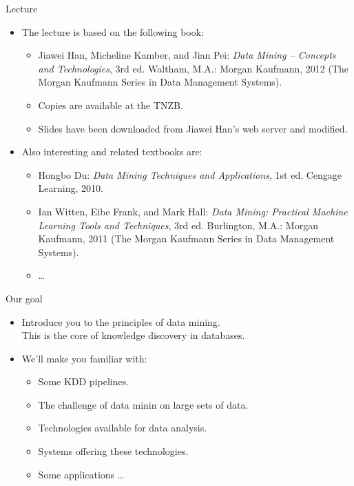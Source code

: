 \documentclass[aspectratio=169,t]{beamer}
\begin{document}
  { %
    \begin{frame}{Lecture}
      \begin{itemize}
          \item The lecture is based on the following book:
              \begin{itemize}
                  \item Jiawei Han, Micheline Kamber, and Jian Pei: \emph{Data Mining – Concepts and Technologies}, 3rd ed. Waltham, M.A.: Morgan Kaufmann, 2012 (The Morgan Kaufmann Series in Data Management Systems).
                  \item \small{Copies are available at the TNZB.}
                  \item \small{Slides have been downloaded from Jiawei Han's web server and modified.}
              \end{itemize}
          \item Also interesting and related textbooks are:
              \begin{itemize}
                  \item Hongbo Du: \emph{Data Mining Techniques and Applications}, 1st ed. Cengage Learning, 2010.
                  \item Ian Witten, Eibe Frank, and Mark Hall: \emph{Data Mining: Practical Machine Learning Tools and Techniques}, 3rd ed. Burlington, M.A.: Morgan Kaufmann, 2011 (The Morgan Kaufmann Series in Data Management Systems).
                  \item \ldots
              \end{itemize}
      \end{itemize}
    \end{frame}
  }

  { %
    \begin{frame}{Our goal}
      \begin{itemize}
          \item Introduce you to the principles of data mining. \\ This is the core of knowledge discovery in databases.
          \item We'll make you familiar with:
              \begin{itemize}
                  \item Some KDD pipelines.
                  \item The challenge of data minin on large sets of data.
                  \item Technologies available for data analysis.
                  \item Systems offering these technologies.
                  \item Some applications \ldots
              \end{itemize}
      \end{itemize}
    \end{frame}
  }
\end{document}
